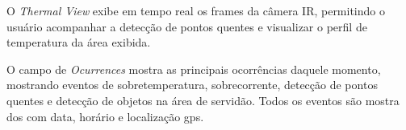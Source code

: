 O \textit{Thermal View} exibe em  tempo real os frames da câmera IR, permitindo o usuário acompanhar a detecção de pontos quentes e visualizar o perfil de temperatura da área exibida. 

O campo de \textit{Ocurrences} mostra as principais ocorrências daquele momento, mostrando eventos de sobretemperatura, sobrecorrente, detecção de pontos quentes e detecção de objetos na área de servidão. Todos os eventos são mostra
dos com data, horário e localização gps. 


